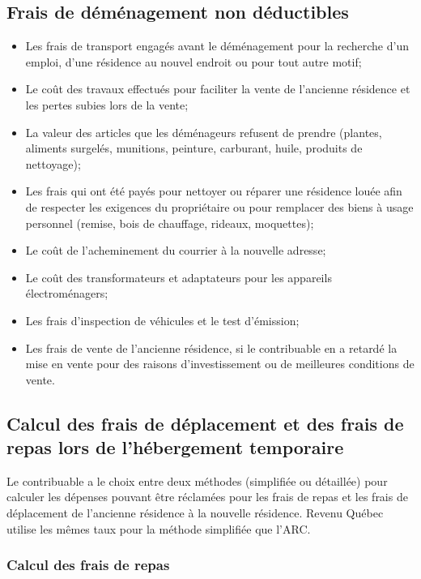 \subsection{Frais de déménagement non déductibles}
\begin{itemize}[label=]
	\item Les frais de transport engagés avant le déménagement pour la recherche d'un emploi, d'une résidence au nouvel endroit ou pour tout autre motif;
	\item Le coût des travaux effectués pour faciliter la vente de l'ancienne résidence et les pertes subies lors de la vente;
	\item La valeur des articles que les déménageurs refusent de prendre (plantes, aliments surgelés, munitions, peinture, carburant, huile, produits de nettoyage);
	\item Les frais qui ont été payés pour nettoyer ou réparer une résidence louée afin de respecter les exigences du propriétaire ou pour remplacer des biens à usage personnel (remise, bois de chauffage, rideaux, moquettes);
	\item Le coût de l'acheminement du courrier à la nouvelle adresse;
	\item Le coût des transformateurs et adaptateurs pour les appareils électroménagers;
	\item Les frais d'inspection de véhicules et le test d'émission; 
	\item Les frais de vente de l'ancienne résidence, si le contribuable en a retardé la mise en vente pour des raisons d'investissement ou de meilleures conditions de vente.
\end{itemize}


\subsection{Calcul des frais de déplacement et des frais de repas lors de l'hébergement temporaire}
Le contribuable a le choix entre deux méthodes (simplifiée ou détaillée) pour calculer les dépenses pouvant être réclamées pour les frais de repas et les frais de déplacement de l'ancienne résidence à la nouvelle résidence. Revenu Québec utilise les mêmes taux pour la méthode simplifiée que l'ARC.

\subsubsection{Calcul des frais de repas}

